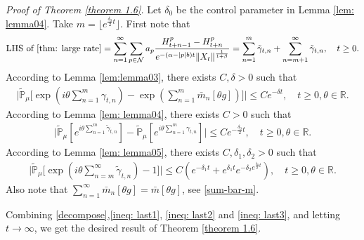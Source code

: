 \documentclass[12pt,a4paper]{amsart}
\theoremstyle{plain}
\theoremstyle{definition}
\numberwithin{equation}{section}
\begin{document}
{\it Proof of Theorem \ref{theorem 1.6}.}\quad
Let $\delta_0$ be the control parameter in Lemma \ref{lem: lemma04}.  Take $m=\lfloor e^{\frac{\delta_0}{2}t}\rfloor$. First note that
\begin{align}\label{decompose}
    \text{LHS of \eqref{thm: large rate}}=\sum_{n=1}^{\infty}\sum_{p\in \mathcal{N}}a_p\frac{H^p_{t+n-1}-H^p_{t+n}}{e^{-(\alpha-|p|b)t}\|X_t\|^{\frac{1}{1+\beta}}}=\sum_{n=1}^m\tilde{\gamma}_{t,n}+\sum_{n=m+1}^{\infty}\tilde{\gamma}_{t,n},\quad t\geq 0.
\end{align}
According to Lemma \ref{lem:lemma03}, there exists $C,\delta>0$ such that
\begin{align}\label{ineq: last1}
    \Big|\tilde{\mathbb{P}}_{\mu}\Big[\exp(i\theta\sum_{n=1}^m\gamma_{t,n})-\exp(\sum_{n=1}^m\bar{m}_n[\theta g])\Big]\Big|\leq C e^{-\delta t},\quad t\geq 0,\theta\in\mathbb{R}.
\end{align}
According to Lemma \ref{lem: lemma04}, there exists $C>0$ such that
\begin{align}\label{ineq: last2}
    \Big|\tilde{\mathbb{P}}_{\mu}[e^{i\theta\sum_{n=1}^m \tilde{\gamma}_{t,n}}]-\tilde{\mathbb{P}}_{\mu}[e^{i\theta \sum_{n=1}^m\gamma_{t,n}}]\Big|\leq C  e^{-\frac{\delta_0}{2} t},\quad t\geq 0, \theta\in \mathbb{R}.
 \end{align}
 According to Lemma \ref{lem: lemma05}, there exists $C,\delta_1,\delta_2>0$ such that
 \begin{align}\label{ineq: last3}
  \Big|\tilde{\mathbb{P}}_{\mu}\Big[\exp(i\theta \sum_{n=m}^{\infty}\tilde{\gamma}_{t,n})-1\Big]\Big|\leq C(e^{-\delta_1 t}+e^{\delta_1 t}e^{-\delta_2 e^{\frac{\delta_0}{2}t}}),\quad t\geq 0, \theta\in \mathbb{R}.
\end{align}
Also note that $\sum_{n=1}^\infty\bar{m}_n[\theta g]=\bar{m}[\theta g]$, see \eqref{sum-bar-m}.

Combining \eqref{decompose},\eqref{ineq: last1}, \eqref{ineq: last2} and \eqref{ineq: last3}, and letting $t\to\infty$, we get the desired result of Theorem \ref{theorem 1.6}.
\appendix
\section{}
\end{document}
